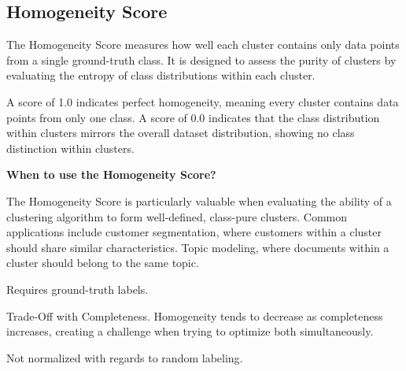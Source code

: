 \subsection{Homogeneity Score}

The Homogeneity Score measures how well each cluster contains only data points from a single ground-truth class.
It is designed to assess the purity of clusters by evaluating the entropy of class distributions within each cluster.

\begin{center}
\end{center}

A score of 1.0 indicates perfect homogeneity, meaning every cluster contains data points from only one class. 
A score of 0.0 indicates that the class distribution within clusters mirrors the overall dataset distribution,
showing no class distinction within clusters.

\textbf{When to use the Homogeneity Score?}

The Homogeneity Score is particularly valuable when evaluating the ability of a clustering algorithm to form well-defined,
class-pure clusters. Common applications include customer segmentation, where customers within a cluster should share similar characteristics.
Topic modeling, where documents within a cluster should belong to the same topic.

{
    \item Requires ground-truth labels.
    \item Trade-Off with Completeness. Homogeneity tends to decrease as completeness increases, creating a challenge when trying to optimize both simultaneously.
    \item Not normalized with regards to random labeling.
}


